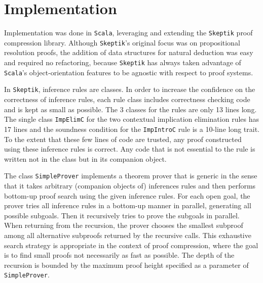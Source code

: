 \documentclass{llncs}
\newcommand{\Skeptik}{\texttt{Skeptik}\xspace}
\begin{document}
\section{Implementation}
\label{sec:Implementation}

Implementation was done in \texttt{Scala}, leveraging and extending the {\Skeptik} proof compression library. %
Although {\Skeptik}'s original focus was on propositional resolution proofs, the addition of data structures for natural deduction was easy and required no refactoring, because {\Skeptik} has always taken advantage of \texttt{Scala}'s object-orientation features to be agnostic with respect to proof systems. 

In {\Skeptik}, inference rules are classes. In order to increase the confidence on the correctness of inference rules, each rule class includes correctness checking code and is kept as small as possible. The 3 classes for the {\ND} rules are only 13 lines long. The single class \texttt{ImpElimC} for the two contextual implication elimination rules has 17 lines and the soundness condition for the \texttt{ImpIntroC} rule is a 10-line long trait. To the extent that these few lines of code are trusted, any proof constructed using these inference rules is correct. Any code that is not essential to the rule is written not in the class but in its companion object.

The class \texttt{SimpleProver} implements a theorem prover that is generic in the sense that it takes arbitrary (companion objects of) inferences rules and then performs bottom-up proof search using the given inference rules. For each open goal, the prover tries all inference rules in a bottom-up manner in parallel, generating all possible subgoals. Then it recursively tries to prove the subgoals in parallel. When returning from the recursion, the prover chooses the smallest subproof among all alternative subproofs returned by the recursive calls. This exhaustive search strategy is appropriate in the context of proof compression, where the goal is to find small proofs not necessarily as fast as possible. The depth of the recursion is bounded by the maximum proof height specified as a parameter of \texttt{SimpleProver}.
\end{document}
